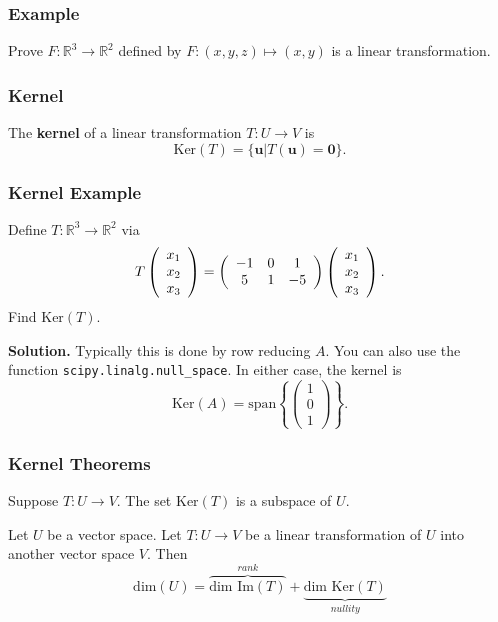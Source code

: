 \documentclass{beamer}
\begin{document}
\begin{frame}[t]
\frametitle{Example}
\begin{Example}
Prove $F: \mathbb{R}^3\to\mathbb{R}^2$ defined by $F:(x, y, z)\mapsto (x, y)$ is a linear transformation.
\end{Example}

\end{frame}

\begin{frame}
\frametitle{Kernel}
\begin{Definition}
The {\bf kernel} of a linear transformation $T:U\to V$ is 
$$
\text{Ker}(T) = \{{\boldsymbol u} | T({\boldsymbol u}) = {\boldsymbol 0}\}.
$$
\end{Definition}
\end{frame}

\begin{frame}[t]
\frametitle{Kernel Example}
\tiny
\begin{Example}
Define $T: \mathbb{R}^3\to \mathbb{R}^2$ via
$$
T\left(\begin{array}{c} x_1\\ x_2\\ x_3\end{array}\right) = \left(\begin{array}{c c c} -1	&	0	&	1\\  5		&	1	&	-5\end{array}\right) \left(\begin{array}{c} x_1\\ x_2\\ x_3\end{array}\right).
$$
Find $\text{Ker}(T)$.
\end{Example}

{\bf Solution.} Typically this is done by row reducing $A$. You can also use the function \texttt{scipy.linalg.null\_space}. In either case, the kernel is
$$
\text{Ker}(A) = \text{span}\left\{\left(\begin{array}{c} 1\\ 0\\ 1\end{array}\right)\right\}.
$$
\end{frame}

\begin{frame}
\frametitle{Kernel Theorems}
\begin{Theorem}
Suppose $T: U\to V$. The set $\text{Ker}(T)$ is a subspace of $U$.
\end{Theorem}

\begin{Theorem}
Let $U$ be a vector space. Let $T: U\to V$ be a linear transformation of $U$ into another vector space $V$. Then
$$
\text{dim}(U) = \overbrace{\text{dim\ Im}(T)}^{rank}+  \underbrace{\text{dim\ Ker}(T)}_{nullity}
$$
\end{Theorem}

\end{frame}
\end{document}
